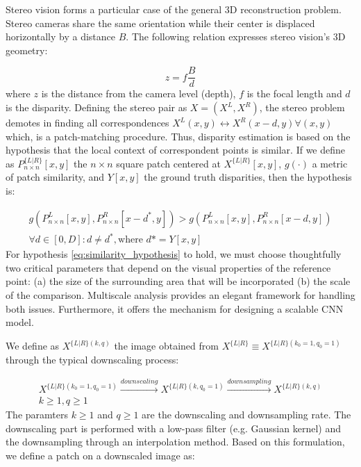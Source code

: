 \documentclass[runningheads]{llncs}
\begin{document}
Stereo vision forms a particular case of the general 3D reconstruction problem. Stereo cameras share the same orientation while their center is displaced horizontally by a distance $B$. The following relation expresses stereo vision's 3D geometry:

\begin{equation} \label{eq:stereo_geometry}
z = f\frac{B}{d}
\end{equation}
%
where $z$ is the distance from the camera level (depth), $f$ is the focal length and $d$ is the disparity. Defining the stereo pair as $X = (X^L, X^R)$, the stereo problem demotes in finding all correspondences $X^L(x,y) \leftrightarrow X^R(x-d, y) \forall (x,y)$ which, is a patch-matching procedure. Thus, disparity estimation is based on the hypothesis that the local context of correspondent points is similar. If we define as $P^{ \{L|R\} }_{n \times n}[x,y]$ the  $n \times n$ square patch centered at $X^{ \{L|R\} }[x,y]$, $g(\cdot)$ a metric of patch similarity, and $Y[x,y]$ the ground truth disparities, then the hypothesis is:

\begin{equation}
\begin{gathered} \label{eq:similarity_hypothesis}
    g(P^L_{n \times n}[x,y], P^R_{n \times n}[x-d^*,y]) > g(P^L_{n \times n}[x,y], P^R_{n \times n}[x-d,y]) \\
    \forall d \in [0,D] : d \neq d^*, \text{where $d* = Y[x,y]$}
\end{gathered}
\end{equation}
%
For hypothesis \ref{eq:similarity_hypothesis} to hold, we must choose thoughtfully two critical parameters that depend on the visual properties of the reference point: (a) the size of the surrounding area that will be incorporated (b) the scale of the comparison. Multiscale analysis provides an elegant framework for handling both issues. Furthermore, it offers the mechanism for designing a scalable CNN model.

We define as $X^{ \{L|R\} (k,q)}$ the image obtained from $X^{ \{L|R\}} \equiv X^{ \{L|R\} (k_0=1,q_0=1)}$ through the typical downscaling process:

\begin{equation}
\begin{gathered} \label{eq:downsampling_procedure}
    X^{ \{L|R\} (k_0=1,q_0=1)} \xrightarrow{downscaling} 
    X^{ \{L|R\} (k,q_0=1)} \xrightarrow{downsampling} 
    X^{ \{L|R\} (k,q)}
    \\
    k\geq 1, q\geq 1 
\end{gathered}
\end{equation}
%
The paramters $k \geq 1$ and $q \geq 1$ are the downscaling and downsampling rate. The downscaling part is performed with a low-pass filter (e.g. Gaussian kernel) and the downsampling through an interpolation method. Based on this formulation, we define a patch on a downscaled image as:
\end{document}
